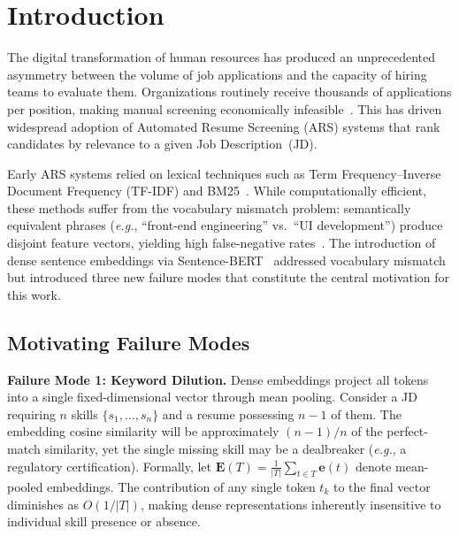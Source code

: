 \documentclass[smallcondensed,numbers]{sn-jnl}
\begin{document}

\section{Introduction}
\label{sec:intro}

The digital transformation of human resources has produced an unprecedented asymmetry between the volume of job applications and the capacity of hiring teams to evaluate them. Organizations routinely receive thousands of applications per position, making manual screening economically infeasible~\cite{chen2023automated,kessler2018algorithm}. This has driven widespread adoption of Automated Resume Screening (ARS) systems that rank candidates by relevance to a given Job Description~(JD).

Early ARS systems relied on lexical techniques such as Term Frequency--Inverse Document Frequency (TF-IDF) and BM25~\cite{robertson2009probabilistic}. While computationally efficient, these methods suffer from the vocabulary mismatch problem: semantically equivalent phrases (\textit{e.g.}, ``front-end engineering'' vs.\ ``UI development'') produce disjoint feature vectors, yielding high false-negative rates~\cite{singh2020automated}. The introduction of dense sentence embeddings via Sentence-BERT~\cite{reimers2019sbert} addressed vocabulary mismatch but introduced three new failure modes that constitute the central motivation for this work.

\subsection{Motivating Failure Modes}

\textbf{Failure Mode 1: Keyword Dilution.} Dense embeddings project all tokens into a single fixed-dimensional vector through mean pooling. Consider a JD requiring $n$ skills $\{s_1, \ldots, s_n\}$ and a resume possessing $n{-}1$ of them. The embedding cosine similarity will be approximately $(n{-}1)/n$ of the perfect-match similarity, yet the single missing skill may be a dealbreaker (\textit{e.g.}, a regulatory certification). Formally, let $\mathbf{E}(T) = \frac{1}{|T|}\sum_{t \in T} \mathbf{e}(t)$ denote mean-pooled embeddings. The contribution of any single token $t_k$ to the final vector diminishes as $O(1/|T|)$, making dense representations inherently insensitive to individual skill presence or absence.
\end{document}
